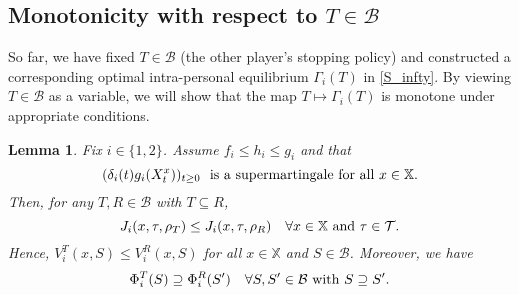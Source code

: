 \documentclass[11pt,reqno]{article}
\numberwithin{equation}{section}
\newtheorem{lemma}{Lemma}[section]
\newcommand{\X}{\mathbb{X}}
\newcommand{\B}{\mathcal{B}}
\begin{document}
\subsection{Monotonicity with respect to $T\in\B$}
So far, we have fixed $T\in\B$ (the other player's stopping policy) and constructed a corresponding optimal intra-personal equilibrium $\Gamma_i(T)$ in \eqref{S_infty}. By viewing $T\in\B$ as a variable, we will show that the map $T\mapsto\Gamma_i(T)$ is monotone under appropriate conditions. 
 
\begin{lemma}\label{l6}
Fix $i\in\{1,2\}$. Assume $f_i\leq h_i\leq g_i$ and that 
\begin{equation}\label{supermartingale}
(\delta_i(t)g_i(X_t^x))_{t\geq 0}\ \  \hbox{is a supermartingale for all $x\in\X$}. 
\end{equation}
Then, for any $T, R\in\B$ with $T\subseteq R$, 
\begin{equation}\label{J<J}
J_i(x,\tau,\rho_T)\leq J_i(x,\tau,\rho_R)\quad\forall x\in\X\ \hbox{and}\ \tau\in\mathcal{T}.
\end{equation}
Hence, $V_i^T(x,S)\leq V_i^R(x,S)$ for all $x\in\mathbb{X}$ and $S\in\B$.
Moreover, we have
\begin{equation}\label{Phi inclusion}
\Phi_i^T(S)\supseteq \Phi_i^R(S')\quad \forall S, S'\in\B\ \hbox{with}\ S\supseteq S'. 
\end{equation}
\end{lemma}
\end{document}
